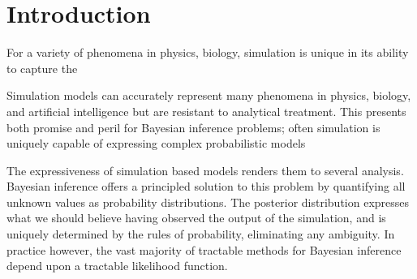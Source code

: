 \section{Introduction}

For a variety of phenomena in physics, biology, simulation is unique in its ability to capture the 

Simulation models can accurately represent many phenomena in physics, biology, and artificial intelligence but are resistant to analytical treatment.
This presents both promise and peril for Bayesian inference problems; often simulation is uniquely capable of expressing complex probabilistic models

The expressiveness of simulation based models renders them to several analysis.
Bayesian inference offers a principled solution to this problem 
by quantifying all unknown values as probability distributions.
The posterior distribution expresses what we should believe having observed the output of the simulation, and is uniquely determined by the rules of probability, eliminating any ambiguity.
In practice however, the vast majority of tractable methods for Bayesian inference depend upon a tractable likelihood function.





